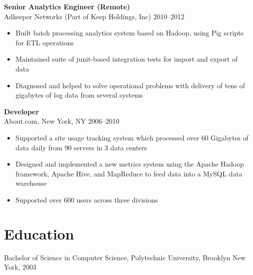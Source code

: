 \documentclass[margin]{res}
\begin{document}
\begin{resume}
{\bf Senior Analytics Engineer (Remote)}\\
Adkeeper Networks (Part of Keep Holdings, Inc) \hfill  2010--2012
\begin{itemize}
  \item Built batch processing analytics system based on Hadoop, using Pig
      scripts for ETL operations
  \item Maintained suite of junit-based integration tests for import and
      export of data
  \item Diagnosed and helped to solve operational problems with delivery of
      tens of gigabytes of log data from several systems
\end{itemize}

{\bf Developer}\\
About.com, New York, NY \hfill  2006--2010
\begin{itemize}
  \item Supported a site usage tracking system which processed
    over 60 Gigabytes of data daily from 90 servers in 3 data centers
  \item Designed and implemented a new metrics system using the Apache
    Hadoop framework, Apache Hive, and MapReduce to feed data into a MySQL data
    warehouse
  \item Supported over 600 users across three divisions
\end{itemize}

\section{Education}
Bachelor of Science in Computer Science, Polytechnic University, Brooklyn New
York, 2003

\end{resume}
\end{document}
